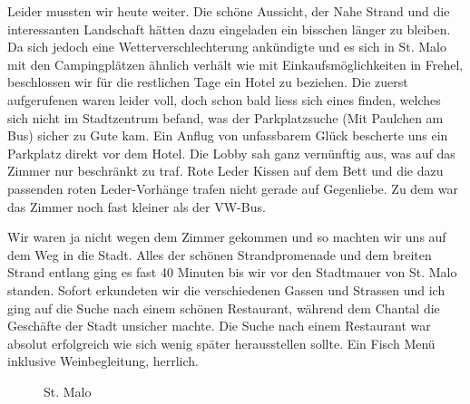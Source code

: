 Leider mussten wir heute weiter.
Die schöne Aussicht, der Nahe Strand und die interessanten Landschaft hätten dazu eingeladen ein bisschen länger zu bleiben.
Da sich jedoch eine Wetterverschlechterung ankündigte und es sich in St. Malo mit den Campingplätzen ähnlich verhält wie mit Einkaufsmöglichkeiten in Frehel, beschlossen wir für die restlichen Tage ein Hotel zu beziehen.
Die zuerst aufgerufenen waren leider voll, doch schon bald liess sich eines finden, welches sich nicht im Stadtzentrum befand, was der Parkplatzsuche (Mit Paulchen am Bus) sicher zu Gute kam.
Ein Anflug von unfassbarem Glück bescherte uns ein Parkplatz direkt vor dem Hotel.
Die Lobby sah ganz vernünftig aus, was auf das Zimmer nur beschränkt zu traf.
Rote Leder Kissen auf dem Bett und die dazu passenden roten Leder-Vorhänge trafen nicht gerade auf Gegenliebe.
Zu dem war das Zimmer noch fast kleiner als der VW-Bus.

Wir waren ja nicht wegen dem Zimmer gekommen und so machten wir uns auf dem Weg in die Stadt.
Alles der schönen Strandpromenade und dem breiten Strand entlang ging es fast 40 Minuten bis wir vor den Stadtmauer von St. Malo standen.
Sofort erkundeten wir die verschiedenen Gassen und Strassen und ich ging auf die Suche nach einem schönen Restaurant, während dem Chantal die Geschäfte der Stadt unsicher machte.
Die Suche nach einem Restaurant war absolut erfolgreich wie sich wenig später herausstellen sollte.
Ein Fisch Menü inklusive Weinbegleitung, herrlich.

\begin{figure}[H]
   \centering
   \quad
   \quad
   \quad
   \caption[St. Malo]{St. Malo}
\end{figure}


